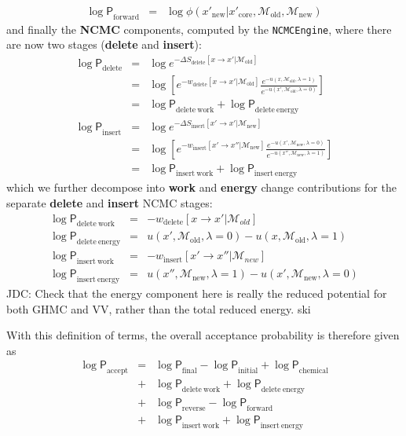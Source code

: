 \documentclass[aps,pre,twocolumn,nofootinbib,superscriptaddress,linenumbers,11point]{revtex4-1}
\newcommand{\logP}{{\log \mathsf{P}}}
\newcommand{\newmol}{{\mathcal{M}_\mathrm{new}}}
\newcommand{\oldmol}{{\mathcal{M}_\mathrm{old}}}
\begin{document}
\begin{itemize}
\begin{eqnarray}
\logP_\mathrm{forward} &=& \log \phi(x'_\mathrm{new} | x'_\mathrm{core}, \mathcal{M}_\mathrm{old}, \mathcal{M}_\mathrm{new})
\end{eqnarray}
and finally the {\bf NCMC} components, computed by the {\tt NCMCEngine}, where there are now two stages ({\bf delete} and {\bf insert}):
\begin{eqnarray}
\logP_\mathrm{delete} &=& \log e^{-\Delta S_\mathrm{delete}[x \rightarrow x' | \mathcal{M}_\mathrm{old}]}  \label{equation:two-stage-ncmc-delete} \\
&=& \log \left[ e^{-w_\mathrm{delete}[x \rightarrow x' | \mathcal{M}_\mathrm{old}]} \frac{e^{-u(x, \mathcal{M}_\mathrm{old}, \lambda=1)}}{e^{-u(x', \mathcal{M}_\mathrm{old}, \lambda=0)}} \right] \nonumber \\
&=& \logP_\mathrm{delete~work} + \logP_\mathrm{delete~energy} \\
\logP_\mathrm{insert} &=& \log e^{-\Delta S_\mathrm{insert}[x' \rightarrow x' | \mathcal{M}_\mathrm{new}]}  \label{equation:two-stage-ncmc-insert} \\
&=& \log \left[ e^{-w_\mathrm{insert}[x' \rightarrow x'' | \mathcal{M}_\mathrm{new}]} \frac{e^{-u(x', \mathcal{M}_\mathrm{new}, \lambda=0)}}{e^{-u(x'', \mathcal{M}_\mathrm{new}, \lambda=1)}} \right] \nonumber \\
&=& \logP_\mathrm{insert~work} + \logP_\mathrm{insert~energy}
\end{eqnarray}
which we further decompose into {\bf work} and {\bf energy} change contributions for the separate {\bf delete} and {\bf insert} NCMC stages:
\begin{eqnarray}
\logP_\mathrm{delete~work} &=& -w_\mathrm{delete}[x \rightarrow x' | \mathcal{M}_{old}] \\
\logP_\mathrm{delete~energy} &=& u(x', \oldmol, \lambda=0) - u(x, \oldmol, \lambda=1) \nonumber \\
\logP_\mathrm{insert~work} &=& -w_\mathrm{insert}[x' \rightarrow x'' | \mathcal{M}_{new}] \\
\logP_\mathrm{insert~energy} &=& u(x'', \newmol, \lambda=1) - u(x', \newmol, \lambda=0) \nonumber
\end{eqnarray}
{\color{red} JDC: Check that the energy component here is really the reduced potential for both GHMC and VV, rather than the total reduced energy.}
ski
\end{itemize}
With this definition of terms, the overall acceptance probability is therefore given as
\begin{eqnarray}
\logP_\mathrm{accept} &=& \logP_\mathrm{final} - \logP_\mathrm{initial} + \logP_\mathrm{chemical} \nonumber \\
&+& \logP_\mathrm{delete~work} + \logP_\mathrm{delete~energy} \nonumber \\
&+& \logP_\mathrm{reverse} - \logP_\mathrm{forward} \nonumber \\
&+& \logP_\mathrm{insert~work} + \logP_\mathrm{insert~energy}
\end{eqnarray}
\end{document}
